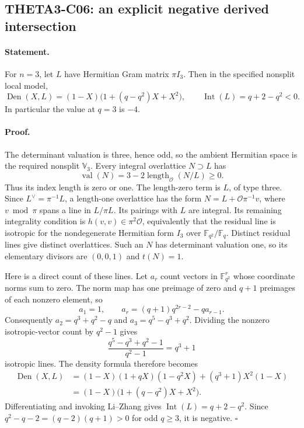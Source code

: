 \documentclass[11pt]{article}
\theoremstyle{definition}\newtheorem{definition}[theorem]{Definition}\newtheorem{remark}[theorem]{Remark}
\begin{document}
\subsection{THETA3-C06: an explicit negative derived intersection}\label{C06}

\paragraph{Statement.}
For $n=3$, let $L$ have Hermitian Gram matrix $\pi I_3$.
Then in the specified nonsplit local model,
\[
 \operatorname{Den}(X,L)=(1-X)\bigl(1+(q-q^2)X+X^2\bigr),
 \qquad \operatorname{Int}(L)=q+2-q^2<0.
\]
In particular the value at $q=3$ is $-4$.

\paragraph{Proof.}
The determinant valuation is three, hence odd, so the ambient
Hermitian space is the required nonsplit $\mathbb V_3$. Every
integral overlattice $N\supset L$ has
\[
 \operatorname{val}(N)=3-2\operatorname{length}_{\mathcal O}(N/L)
 \geq0.
\]
Thus its index length is zero or one. The length-zero term is $L$,
of type three. Since $L^\vee=\pi^{-1}L$, a length-one overlattice
has the form $N=L+\mathcal O\pi^{-1}v$, where $v\bmod\pi$ spans
a line in $L/\pi L$. Its pairings with $L$ are integral. Its
remaining integrality condition is
$h(v,v)\in\pi^2\mathcal O$, equivalently that the residual line
is isotropic for the nondegenerate Hermitian form $I_3$ over
$\mathbb F_{q^2}/\mathbb F_q$. Distinct residual lines give
distinct overlattices. Such an $N$ has determinant valuation one,
so its elementary divisors are $(0,0,1)$ and $t(N)=1$.

Here is a direct count of these lines. Let $a_r$ count vectors in
$\mathbb F_{q^2}^r$ whose coordinate norms sum to zero. The norm
map has one preimage of zero and $q+1$ preimages of each nonzero
element, so
\[
 a_1=1,\qquad
 a_r=(q+1)q^{2r-2}-q a_{r-1}.
\]
Consequently $a_2=q^3+q^2-q$ and $a_3=q^5-q^3+q^2$. Dividing the
nonzero isotropic-vector count by $q^2-1$ gives
\[
 \frac{q^5-q^3+q^2-1}{q^2-1}=q^3+1
\]
isotropic lines. The density formula therefore becomes
\begin{align*}
 \operatorname{Den}(X,L)
 &=(1-X)(1+qX)(1-q^2X)+(q^3+1)X^2(1-X)\\
 &=(1-X)\bigl(1+(q-q^2)X+X^2\bigr).
\end{align*}
Differentiating and invoking Li--Zhang gives
$\operatorname{Int}(L)=q+2-q^2$. Since
$q^2-q-2=(q-2)(q+1)>0$ for odd $q\geq3$, it is negative.
$\square$
\end{document}
